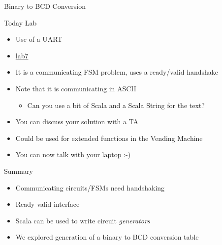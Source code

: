 \begin{frame}[fragile]{Binary to BCD Conversion}
\end{frame}

\begin{frame}[fragile]{Today Lab}
\begin{itemize}
\item Use of a UART
\item \href{https://github.com/schoeberl/chisel-lab/tree/master/lab7}{lab7}
\item It is a communicating FSM problem, uses a ready/valid handshake
\item Note that it is communicating in ASCII
\begin{itemize}
\item Can you use a bit of Scala and a Scala String for the text?
\end{itemize}
\item You can discuss your solution with a TA
\item Could be used for extended functions in the Vending Machine
\item You can now talk with your laptop :-)
\end{itemize}
\end{frame}


\begin{frame}[fragile]{Summary}
\begin{itemize}
\item Communicating circuits/FSMs need handshaking
\item Ready-valid interface
\item Scala can be used to write circuit \emph{generators}
\item We explored generation of a binary to BCD conversion table
\end{itemize}
\end{frame}





